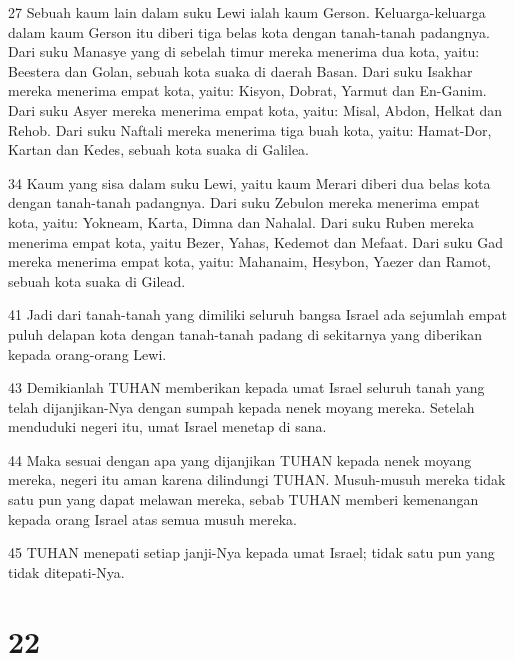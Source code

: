 \par 27 Sebuah kaum lain dalam suku Lewi ialah kaum Gerson. Keluarga-keluarga dalam kaum Gerson itu diberi tiga belas kota dengan tanah-tanah padangnya. Dari suku Manasye yang di sebelah timur mereka menerima dua kota, yaitu: Beestera dan Golan, sebuah kota suaka di daerah Basan. Dari suku Isakhar mereka menerima empat kota, yaitu: Kisyon, Dobrat, Yarmut dan En-Ganim. Dari suku Asyer mereka menerima empat kota, yaitu: Misal, Abdon, Helkat dan Rehob. Dari suku Naftali mereka menerima tiga buah kota, yaitu: Hamat-Dor, Kartan dan Kedes, sebuah kota suaka di Galilea.
\par 34 Kaum yang sisa dalam suku Lewi, yaitu kaum Merari diberi dua belas kota dengan tanah-tanah padangnya. Dari suku Zebulon mereka menerima empat kota, yaitu: Yokneam, Karta, Dimna dan Nahalal. Dari suku Ruben mereka menerima empat kota, yaitu Bezer, Yahas, Kedemot dan Mefaat. Dari suku Gad mereka menerima empat kota, yaitu: Mahanaim, Hesybon, Yaezer dan Ramot, sebuah kota suaka di Gilead.
\par 41 Jadi dari tanah-tanah yang dimiliki seluruh bangsa Israel ada sejumlah empat puluh delapan kota dengan tanah-tanah padang di sekitarnya yang diberikan kepada orang-orang Lewi.
\par 43 Demikianlah TUHAN memberikan kepada umat Israel seluruh tanah yang telah dijanjikan-Nya dengan sumpah kepada nenek moyang mereka. Setelah menduduki negeri itu, umat Israel menetap di sana.
\par 44 Maka sesuai dengan apa yang dijanjikan TUHAN kepada nenek moyang mereka, negeri itu aman karena dilindungi TUHAN. Musuh-musuh mereka tidak satu pun yang dapat melawan mereka, sebab TUHAN memberi kemenangan kepada orang Israel atas semua musuh mereka.
\par 45 TUHAN menepati setiap janji-Nya kepada umat Israel; tidak satu pun yang tidak ditepati-Nya.

\chapter{22}

